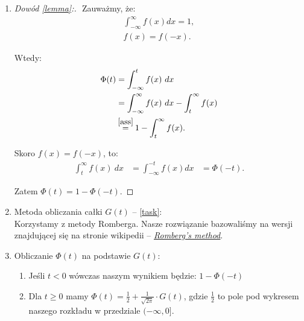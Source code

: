 \documentclass[12pt,oneside,a4paper]{article}
\newcommand\numeq[1]%
  {\stackrel{\scriptscriptstyle \mkern-1.5mu#1\mkern-1.5mu }{=}}
\begin{document}
\begin{enumerate}
    \item 
    \begin{proof}[Dowód \eqref{lemma}:]
    $ $\newline
    Zauważmy, że: 
    \begin{equation}
    \begin{aligned}
        \int^{\infty}_{- \infty } f(x) dx = 1,\label{ass}\\
        f(x) = f(-x).
    \end{aligned}
    \end{equation}
    
    Wtedy:
    \begin{equation}
    \begin{aligned}
        \Phi(t) &= \int^{t}_{- \infty } f(x)\ dx\\
                &= \int^{\infty}_{- \infty } f(x)\ dx - \int^{\infty}_{t} f(x)\\
                &\numeq{\eqref{ass}} 1 - \int^{\infty}_{t} f(x).
    \end{aligned}
    \end{equation}
    
    Skoro $f(x) = f(-x)$, to: 
    \begin{equation}
    \begin{aligned}
    \int^{\infty}_{t} f(x)\ dx &= \int^{-t}_{- \infty } f(x)  dx 
                               &= \Phi(-t).
    \end{aligned}
    \end{equation}
    
    Zatem $\Phi(t) = 1 - \Phi(-t)$.
    
    \end{proof}
    
    \newpage
    \item Metoda obliczania całki $G(t)$ -- \eqref{task}:\\
        Korzystamy z metody Romberga. Nasze rozwiązanie bazowaliśmy na wersji znajdującej się na stronie wikipedii -- \textit{\underline{\href{https://en.wikipedia.org/wiki/Romberg\%27s_method}{Romberg's method}}}.
    
    
    
    \item Obliczanie $\Phi(t)$ na podstawie $G(t)$:
    \begin{enumerate}
        \item Jeśli $t < 0$ wówczas naszym wynikiem będzie: $1 - \Phi(-t)$
        \item Dla $t \geq 0$ mamy $\Phi(t) = \frac{1}{2} + \frac{1}{\sqrt{2\pi}} \cdot G(t)$, gdzie $\frac{1}{2}$ to pole pod wykresem naszego rozkładu w przedziale $(-\infty,0]$.
        
    \end{enumerate}
    
\end{enumerate}
\end{document}
